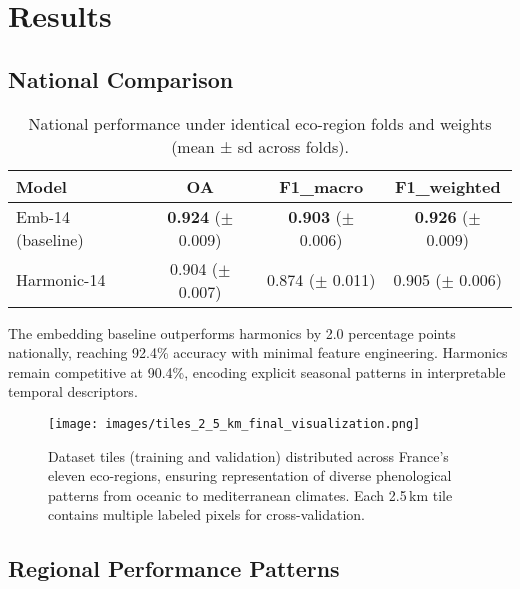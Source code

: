 \documentclass[utf8]{FrontiersinHarvard}
\begin{document}
\section{Results}
\subsection{National Comparison}
\begin{table}[H]
    \centering
    \begin{tabular}{lccc}
        \hline
        \textbf{Model} & \textbf{OA} & \textbf{F1\_macro} & \textbf{F1\_weighted} \\ \hline
        Emb-14 (baseline) & \textbf{0.924} (\(\pm\) 0.009) & \textbf{0.903} (\(\pm\) 0.006) & \textbf{0.926} (\(\pm\) 0.009) \\
        Harmonic-14 & 0.904 (\(\pm\) 0.007) & 0.874 (\(\pm\) 0.011) & 0.905 (\(\pm\) 0.006) \\
        \hline
    \end{tabular}
    \caption{National performance under identical eco-region folds and weights (mean ± sd across folds).}
    \label{tab:national_comparison}
\end{table}

The embedding baseline outperforms harmonics by 2.0 percentage points nationally, reaching 92.4\% accuracy with minimal feature engineering. Harmonics remain competitive at 90.4\%, encoding explicit seasonal patterns in interpretable temporal descriptors.

\begin{figure}[H]
    \centering
    \texttt{[image: images/tiles\_2\_5\_km\_final\_visualization.png]}
    \caption{Dataset tiles (training and validation) distributed across France's eleven eco-regions, ensuring representation of diverse phenological patterns from oceanic to mediterranean climates. Each 2.5\,km tile contains multiple labeled pixels for cross-validation.}
    \label{fig:training_tiles}
\end{figure}

\subsection{Regional Performance Patterns}
\end{document}
